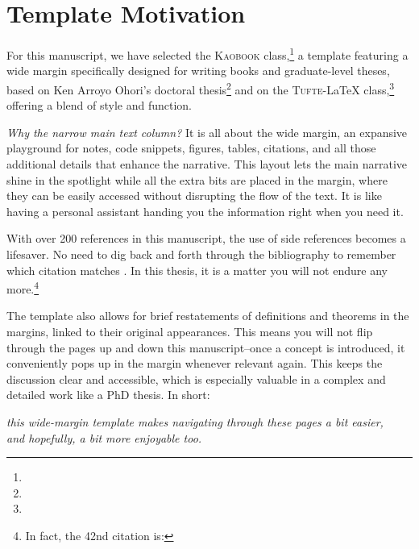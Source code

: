 \def\customcitkey{}


\chapter*{Template Motivation}

For this manuscript, we have selected the \textsc{Kaobook} class,\footnote{} a template featuring a wide margin specifically designed for writing books and graduate-level theses, based on Ken Arroyo Ohori's doctoral thesis\footnote{} and on the \textsc{Tufte}-\LaTeX{} class,\footnote{} offering a blend of style and function.

\emph{Why the narrow main text column?} It is all about the wide margin, an expansive playground for notes, code snippets, figures, tables, citations, and all those additional details that enhance the narrative.
This layout lets the main narrative shine in the spotlight while all the extra bits are placed in the margin, where they can be easily accessed without disrupting the flow of the text. It is like having a personal assistant handing you the information right when you need it.

With over 200 references in this manuscript, the use of side references becomes a lifesaver.
No need to dig back and forth through the bibliography to remember which citation matches \cite{\customcitkey}.
In this thesis, it is a matter you will not endure any more.\footnote{In fact, the 42nd citation is: \formatmargincitation{\customcitkey}}

The template also allows for brief restatements of definitions and theorems in the margins, linked to their original appearances.
This means you will not flip through the pages up and down this manuscript--once a concept is introduced, it conveniently pops up in the margin whenever relevant again. This keeps the discussion clear and accessible, which is especially valuable in a complex and detailed work like a PhD thesis. In short:
\begin{center}\itshape
this wide-margin template makes navigating through these pages a bit easier, \\
and hopefully, a bit more enjoyable too.
\end{center}
